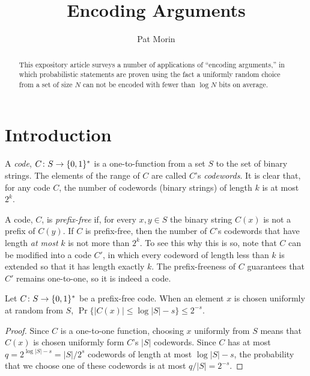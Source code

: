 \documentclass[lotsofwhite]{patmorin}
\title{Encoding Arguments}
\author{Pat Morin}
\date{}
\begin{document}
\begin{titlepage}
\maketitle

\begin{abstract}
This expository article surveys a number of applications of ``encoding
arguments,'' in which probabilistic statements are proven using the fact
a uniformly random choice from a set of size $N$ can not be encoded with
fewer than $\log N$ bits on average.
\end{abstract}


\end{titlepage}
\tableofcontents
\newpage
{}

\section{Introduction}


A \emph{code}, $C\colon S\to \{0,1\}^*$ is a one-to-function from
a set $S$ to the set of binary strings.  The elements of the range of
$C$ are called $C$'s \emph{codewords}.  It is clear that, for
any code $C$, the number of codewords (binary strings) of length $k$
is at most $2^k$.

A code, $C$, is \emph{prefix-free} if, for every $x,y\in S$ the binary
string $C(x)$ is not a prefix of $C(y)$.  If $C$ is prefix-free, then
the number of $C$'s codewords that have length \emph{at most} $k$ is
not more than $2^k$. To see this why this is so, note that $C$ can be
modified into a code $C'$, in which every codeword of length less than $k$
is extended so that it has length exactly $k$. The prefix-freeness of $C$
guarantees that $C'$ remains one-to-one, so it is indeed a code.


\begin{lem}
Let $C\colon S\to \{0,1\}^*$ be a prefix-free code. When an element $x$ is chosen uniformly at random from $S$, $\Pr\{|C(x)|\le \log|S|-s\}\le 2^{-s}$.
\end{lem}

\begin{proof}
Since $C$ is a one-to-one function, choosing $x$ uniformly from $S$
means that $C(x)$ is chosen uniformly form $C$'s $|S|$ codewords. Since
$C$ has at most $q=2^{\log|S|-s}=|S|/2^s$ codewords of length at most
$\log|S|-s$, the probability that we choose one of these codewords is
at most $q/|S|=2^{-s}$.
\end{proof}
\end{document}
